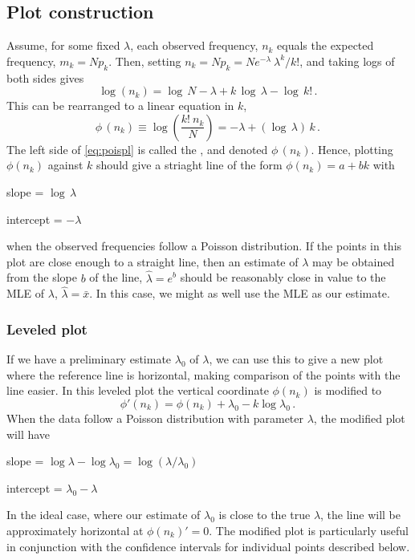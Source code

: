 \documentclass[11pt]{book}\usepackage[]{graphicx}\usepackage[]{color}
\begin{document}
\subsection{Plot construction}
Assume, for some fixed \(\lambda\), each observed frequency, \(n_k\)
equals the expected frequency, \(m_k = N p_k\).  Then, setting
\(n_k = N p_k  = N { e^{ - \lambda } \:  \lambda^k } /  { k ! }\),
and taking logs of both sides gives
\begin{equation*}
  \log ( n_k ) = \log \,  N - \lambda  +  k \,  \log \,  \lambda  -
  \log \,  k !
  \period
\end{equation*}
This can be rearranged to a linear equation in $k$,
\begin{equation} \label{eq:poispl}
  \phi \,  ( n_k ) \equiv \log \left(  \frac{ k ! \:  n_k } {N} \right)
 = - \lambda  +  ( \log \,  \lambda ) \,  k
 \period
\end{equation}
The left side of \eqref{eq:poispl} is called the , and
denoted \(\phi \,  ( n_k )\).  Hence,
plotting \(\phi ( n_k )\) against \(k\) should give a striaght line of the form
\(\phi ( n_k )= a + b k\) with
\begin{itemize*}
\item slope = \(\log  \,  \lambda\)
\item intercept = \(- \lambda\)
\end{itemize*}
when the observed frequencies follow a Poisson distribution.
If the points in this plot are close enough to a straight line,
then an estimate of $\lambda$ may be obtained from the slope $b$ of the line,
$\hat{\lambda} = e^b$ should be reasonably close in value
to the MLE of $\lambda$, $\hat{\lambda} = \bar{x}$.
In this case, we might as well use the MLE as our estimate.

\subsubsection{Leveled plot}
If we have a preliminary estimate $\lambda_0$ of $\lambda$,
we can use this to give a new plot where the reference line
is horizontal, making comparison of the points with the line
easier.
In this leveled plot the vertical coordinate $\phi (n_k)$ is modified to
\begin{equation}\label{eq:pois-leveled}
 \phi ' (n_k) = \phi (n_k) + \lambda_0 - k \log \lambda_0
 \period
\end{equation}
When the data follow a Poisson distribution with parameter
$\lambda$, the modified plot will have
\begin{itemize*}
\item slope = \(\log  \lambda - \log  \lambda_0 = \log ( \lambda / \lambda_0 ) \)
\item intercept = \(\lambda_0 - \lambda\)
\end{itemize*}
In the ideal case, where our estimate of $\lambda_0$ is close to the true
$\lambda$, the line will be approximately
horizontal at $\phi(n_k) ' = 0$.
The modified plot is particularly useful in conjunction with the
confidence intervals for individual points described below.
\end{document}
